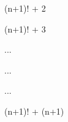 \documentclass[12pt]{article}
\begin{document}
\begin{flushleft}



{\huge (n+1)! + 2} 

\hspace{3 cm}

{\huge (n+1)! + 3} 

\hspace{3 cm}

{\huge ...} 

\hspace{3 cm}

{\huge ...} 

\hspace{3 cm}

{\huge ...} 

\hspace{3 cm}

{\huge (n+1)! + (n+1)}


\end{flushleft}
\end{document}
